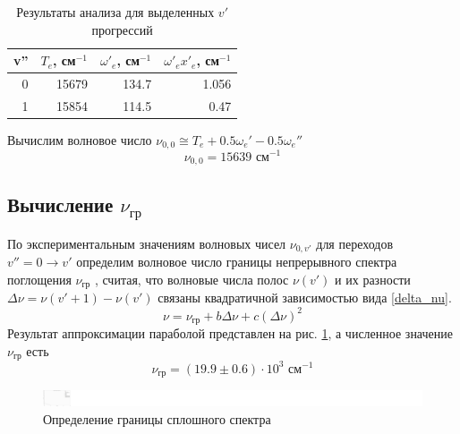 \begin{table}[htbp]
	\centering
	\caption{Результаты анализа для выделенных $v'$ прогрессий}
	\begin{tabular}{|r|r|r|r|}
		\hline
		\multicolumn{1}{|l|}{v''} & \multicolumn{1}{l|}{$T_e$, см$^{-1}$} & \multicolumn{1}{l|}{$\omega'_e$, см$^{-1}$} & \multicolumn{1}{l|}{$\omega'_e x'_e$, см$^{-1}$} \bigstrut\\
		\hline
		0 & 15679 & 134.7 & 1.056 \bigstrut\\
		\hline
		1 & 15854 & 114.5 & 0.47 \bigstrut\\
		\hline
	\end{tabular}%
	\label{tab:parabola}%
\end{table}%

Вычислим волновое число $\nu_{0,0} \cong T_e + 0.5\omega_e' - 0.5\omega_e''$
\begin{equation}
\nu_{0,0} = 15639 \text{ см$^{-1}$}
\end{equation}


\subsection{Вычисление $\nu_{\text{гр}}$}
По экспериментальным значениям волновых чисел $\nu_{0,v'}$ для переходов $v''= 0 \to v'$ определим волновое число границы непрерывного спектра поглощения $\nu_{\text{гр}}$ , считая, что волновые числа полос $\nu(v')$ и их разности $\Delta \nu =\nu(v'+1)-\nu(v')$ связаны квадратичной зависимостью
вида \eqref{delta_nu}.
\begin{equation}
\nu = \nu_{\text{гр}} +b\Delta\nu+c\left(\Delta \nu\right)^2
\label{delta_nu}
\end{equation}
Результат аппроксимации параболой представлен на рис. \ref{fig:delta_nu}, а численное значение $\nu_{\text{гр}}$ есть
\begin{equation}
\nu_{\text{гр}} = (19.9 \pm 0.6) \cdot 10^3 \text{ см$^{-1}$}
\end{equation}
\begin{figure}[h!]
	\centering
	\includegraphics[height=0.45\textheight]{data/delta_nu}
	\caption{Определение границы сплошного спектра}
	\label{fig:delta_nu}
\end{figure}

